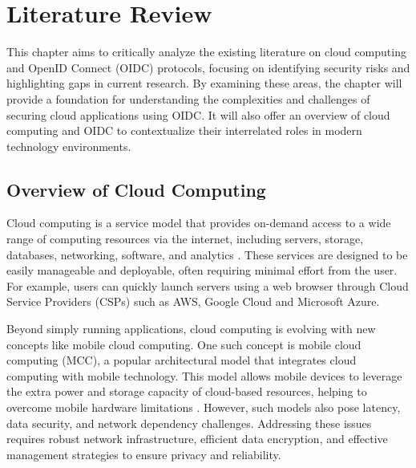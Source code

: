 \chapter{Literature Review}

This chapter aims to critically analyze the existing literature on cloud computing and OpenID Connect (OIDC) protocols, focusing on identifying security risks and highlighting gaps in current research. By examining these areas, the chapter will provide a foundation for understanding the complexities and challenges of securing cloud applications using OIDC. It will also offer an overview of cloud computing and OIDC to contextualize their interrelated roles in modern technology environments.

\section{Overview of Cloud Computing}
Cloud computing is a service model that provides on-demand access to a wide range of computing resources via the internet, including servers, storage, databases, networking, software, and analytics \citep{rashid2019cloud}. These services are designed to be easily manageable and deployable, often requiring minimal effort from the user. For example, users can quickly launch servers using a web browser through Cloud Service Providers (CSPs) such as AWS, Google Cloud and Microsoft Azure. 

Beyond simply running applications, cloud computing is evolving with new concepts like mobile cloud computing. One such concept is mobile cloud computing (MCC), a popular architectural model that integrates cloud computing with mobile technology. This model allows mobile devices to leverage the extra power and storage capacity of cloud-based resources, helping to overcome mobile hardware limitations \citep{mcc}. However, such models also pose latency, data security, and network dependency challenges. Addressing these issues requires robust network infrastructure, efficient data encryption, and effective management strategies to ensure privacy and reliability.

